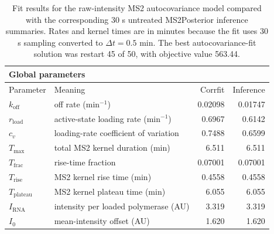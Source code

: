 \begin{table}[tbp]
\centering
\caption{Fit results for the raw-intensity MS2 autocovariance model compared with the corresponding 30 s untreated MS2Posterior inference summaries. Rates and kernel times are in minutes because the fit uses 30 s sampling converted to $\Delta t=0.5$ min. The best autocovariance-fit solution was restart 45 of 50, with objective value 563.44.}
\label{tab:ms2-corrfit-raw-intensity}
\begin{tabular}{llrr}
\toprule
\multicolumn{4}{l}{\textbf{Global parameters}} \\
\midrule
Parameter & Meaning & Corrfit & Inference \\
\midrule
$k_{\mathrm{off}}$ & off rate (min$^{-1}$) & 0.02098 & 0.01747 \\
$r_{\mathrm{load}}$ & active-state loading rate (min$^{-1}$) & 0.6967 & 0.6142 \\
$c_v$ & loading-rate coefficient of variation & 0.7488 & 0.6599 \\
$T_{\max}$ & total MS2 kernel duration (min) & 6.511 & 6.511 \\
$T_{\mathrm{frac}}$ & rise-time fraction & 0.07001 & 0.07001 \\
$T_{\mathrm{rise}}$ & MS2 kernel rise time (min) & 0.4558 & 0.4558 \\
$T_{\mathrm{plateau}}$ & MS2 kernel plateau time (min) & 6.055 & 6.055 \\
$I_{\mathrm{RNA}}$ & intensity per loaded polymerase (AU) & 3.319 & 3.319 \\
$I_0$ & mean-intensity offset (AU) & 1.620 & 1.620 \\
\bottomrule
\end{tabular}

\medskip


\end{table}
